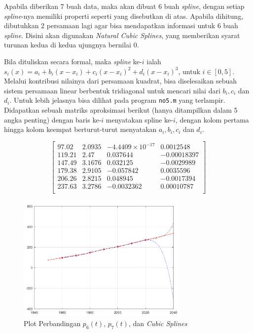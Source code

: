 \documentclass[11pt, a4paper, onecolumn, oneside, final]{report}
\begin{document}
Apabila diberikan $7$ buah data, maka akan dibuat $6$ buah \textit{spline}, dengan setiap \textit{spline}-nya memiliki properti seperti yang disebutkan di atas. Apabila dihitung, dibutuhkan 2 persamaan lagi agar bisa mendapatkan informasi untuk $6$ buah \textit{spline}. Disini akan digunakan \textit{Natural Cubic Splines}, yang memberikan syarat turunan kedua di kedua ujungnya bernilai 0.

Bila dituliskan secara formal, maka \textit{spline} ke-$i$ ialah $s_i(x) = a_i + b_i(x - x_i) + c_i(x-x_i)^2 + d_i(x-x_i)^3$, untuk $i \in [0, 5]$. Melalui kontribusi nilainya dari persamaan kuadrat, bisa diselesaikan sebuah sistem persamaan linear berbentuk tridiagonal untuk mencari nilai dari $b_i, c_i$ dan $d_i$. Untuk lebih jelasnya bisa dilihat pada program \texttt{no5.m} yang terlampir. Didapatkan sebuah matriks aproksimasi berikut (hanya ditampilkan dalam 5 angka penting) dengan baris ke-$i$ menyatakan spline ke-$i$, dengan kolom pertama hingga kolom keempat berturut-turut menyatakan $a_i, b_i, c_i$ dan $d_i$.

$$
\begin{bmatrix}
97.02 & 2.0935 & -4.4409 \times 10^{-17} & 0.0012548\\
119.21 & 2.47 & 0.037644 & -0.00018397\\
147.49 & 3.1676 & 0.032125 & -0.0029989\\
179.38 & 2.9105 & -0.057842 & 0.0035596\\
206.26 & 2.8215 & 0.048945 & -0.0017394\\
237.63 & 3.2786 & -0.0032362 & 0.00010787\\
\end{bmatrix}
$$

\begin{figure}[h!]
    \centering
    \includegraphics[width=0.75\textwidth]{assets/AllPlot.png}
    \caption{Plot Perbandingan $p_6(t)$, $p_7(t)$, dan \textit{Cubic Splines}}
\end{figure}
\end{document}
